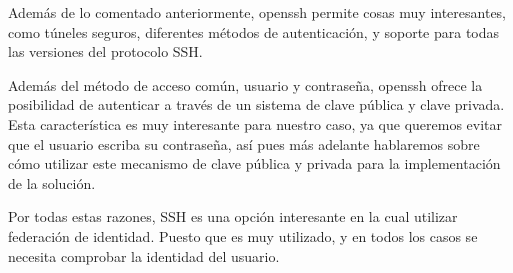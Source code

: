     Además de lo comentado anteriormente, openssh permite cosas muy
    interesantes, como túneles seguros, diferentes métodos de
    autenticación, y soporte para todas las versiones del protocolo SSH.

    Además del método de acceso común, usuario y contraseña, openssh ofrece
    la posibilidad de autenticar a través de un sistema de clave pública y
    clave privada. Esta característica es muy interesante para nuestro
    caso, ya que queremos evitar que el usuario escriba su contraseña, así
    pues más adelante hablaremos sobre cómo utilizar este mecanismo de
    clave pública y privada para la implementación de la solución.

    Por todas estas razones, SSH es una opción interesante en la cual
    utilizar federación de identidad. Puesto que es muy utilizado, y en
    todos los casos se necesita comprobar la identidad del usuario.



